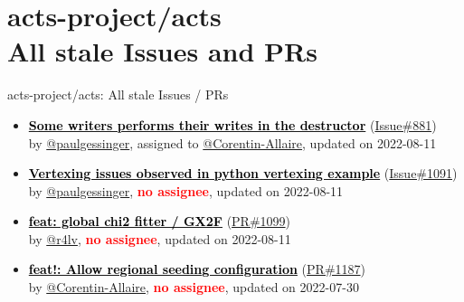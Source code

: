 \section{ acts-project/acts \\ All stale Issues and PRs}
\begin{frame}[allowframebreaks]{ acts-project/acts: All stale Issues / PRs}
  \begin{itemize}
    
    \item\iss\prstale
    \hspace*{0.1em}
    \textbf{\href{https://github.com/acts-project/acts/issues/881}{\textcolor{black}{Some writers performs their writes in the destructor}}}
    (\href{https://github.com/acts-project/acts/issues/881}{Issue\#881}) \\
    by \href{https://github.com/paulgessinger}{@paulgessinger}, {}assigned to \href{https://github.com/Corentin-Allaire}{@Corentin-Allaire}, updated on 2022-08-11

    \item\iss\prstale
    \hspace*{0.1em}
    \textbf{\href{https://github.com/acts-project/acts/issues/1091}{\textcolor{black}{Vertexing issues observed in python vertexing example}}}
    (\href{https://github.com/acts-project/acts/issues/1091}{Issue\#1091}) \\
    by \href{https://github.com/paulgessinger}{@paulgessinger}, {}\textbf{\textcolor{Red}{no assignee}}, updated on 2022-08-11

    \item\propen\prwip\prstale
    \hspace*{0.1em}
    \textbf{\href{https://github.com/acts-project/acts/pull/1099}{\textcolor{black}{feat: global chi2 fitter / GX2F}}}
    (\href{https://github.com/acts-project/acts/pull/1099}{PR\#1099}) \\
    by \href{https://github.com/r4lv}{@r4lv}, {}\textbf{\textcolor{Red}{no assignee}}, updated on 2022-08-11

    \item\propen\prwip\prstale
    \hspace*{0.1em}
    \textbf{\href{https://github.com/acts-project/acts/pull/1187}{\textcolor{black}{feat!: Allow regional seeding configuration}}}
    (\href{https://github.com/acts-project/acts/pull/1187}{PR\#1187}) \\
    by \href{https://github.com/Corentin-Allaire}{@Corentin-Allaire}, {}\textbf{\textcolor{Red}{no assignee}}, updated on 2022-07-30


\end{itemize}
\end{frame}
